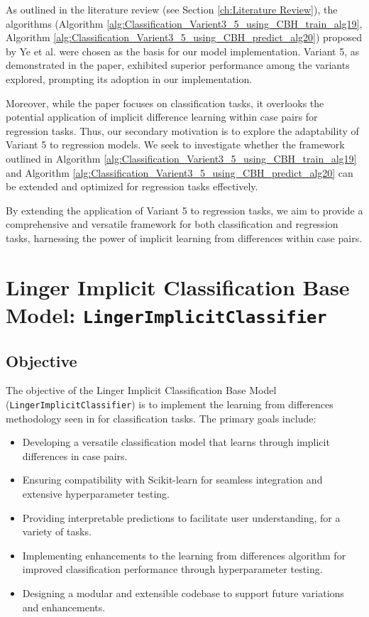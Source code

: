 \documentclass[a4paper, 12pt]{report}
\begin{document}
As outlined in the literature review (see Section \ref{ch:Literature Review}), the algorithms (Algorithm \ref{alg:Classification_Varient3_5_using_CBH_train_alg19}, 
Algorithm \ref{alg:Classification_Varient3_5_using_CBH_predict_alg20}) proposed by Ye et al. were chosen as the basis for our model implementation. Variant 5, 
as demonstrated in the paper, exhibited superior performance among the variants explored, prompting its adoption in our implementation.

Moreover, while the paper focuses on classification tasks, it overlooks the potential application of implicit difference learning within case pairs for regression tasks. 
Thus, our secondary motivation is to explore the adaptability of Variant 5 to regression models. We seek to investigate whether the framework outlined in Algorithm \ref{alg:Classification_Varient3_5_using_CBH_train_alg19} and 
Algorithm \ref{alg:Classification_Varient3_5_using_CBH_predict_alg20} can be extended and optimized for regression tasks effectively.

By extending the application of Variant 5 to regression tasks, we aim to provide a comprehensive and versatile framework for both classification and regression tasks, 
harnessing the power of implicit learning from differences within case pairs.

\section{Linger Implicit Classification Base Model: \texttt{LingerImplicitClassifier}}

\subsection{Objective}
The objective of the Linger Implicit Classification Base Model (\texttt{LingerImplicitClassifier}) is to 
implement the learning from differences methodology seen in \cite{ye2021learning} for classification tasks. The primary goals include:

\begin{itemize}
    \item Developing a versatile classification model that learns through implicit differences in case pairs.
    \item Ensuring compatibility with Scikit-learn for seamless integration and extensive hyperparameter testing.
    \item Providing interpretable predictions to facilitate user understanding, for a variety of tasks.
    \item Implementing enhancements to the learning from differences algorithm for improved classification performance through hyperparameter testing.
    \item Designing a modular and extensible codebase to support future variations and enhancements.
\end{itemize}
\end{document}
